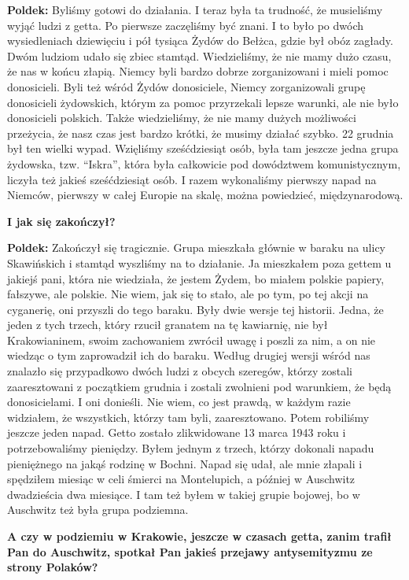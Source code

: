 \begin{otherlanguage}{polish}
\textbf{Poldek:} Byliśmy gotowi do działania. I teraz była ta trudność, że musieliśmy wyjąć ludzi z getta. Po pierwsze zaczęliśmy być znani. I to było po dwóch wysiedleniach dziewięciu i pół tysiąca Żydów do Bełżca, gdzie był obóz zagłady. Dwóm ludziom udało się zbiec stamtąd. Wiedzieliśmy, że nie mamy dużo czasu, że nas w końcu złapią. Niemcy byli bardzo dobrze zorganizowani i mieli pomoc donosicieli. Byli też wśród Żydów donosiciele, Niemcy zorganizowali grupę donosicieli żydowskich, którym za pomoc przyrzekali lepsze warunki, ale nie było donosicieli polskich. Także wiedzieliśmy, że nie mamy dużych możliwości przeżycia, że nasz czas jest bardzo krótki, że musimy działać szybko. 22 grudnia był ten wielki wypad. Wzięliśmy sześćdziesiąt osób, była tam jeszcze jedna grupa żydowska, tzw. "`Iskra"', która była całkowicie pod dowództwem komunistycznym, liczyła też jakieś sześćdziesiąt osób. I razem wykonaliśmy pierwszy napad na Niemców, pierwszy w całej Europie na skalę, można powiedzieć, międzynarodową. 
 
\textbf{I jak się zakończył?}

\textbf{Poldek:} Zakończył się tragicznie. Grupa mieszkała głównie w baraku na ulicy Skawińskich i stamtąd wyszliśmy na to działanie. Ja mieszkałem poza gettem u jakiejś pani, która nie wiedziała, że jestem Żydem, bo miałem polskie papiery, fałszywe, ale polskie. Nie wiem, jak się to stało, ale po tym, po tej akcji na cyganerię, oni przyszli do tego baraku. Były dwie wersje tej historii. Jedna, że jeden z tych trzech, który rzucił granatem na tę kawiarnię, nie był Krakowianinem, swoim zachowaniem zwrócił uwagę i poszli za nim, a on nie wiedząc o tym zaprowadził ich do baraku. Według drugiej wersji wśród nas znalazło się przypadkowo dwóch ludzi z obcych szeregów, którzy zostali zaaresztowani z początkiem grudnia i zostali zwolnieni pod warunkiem, że będą donosicielami. I oni donieśli. Nie wiem, co jest prawdą, w każdym razie widziałem, że wszystkich, którzy tam byli, zaaresztowano. Potem robiliśmy jeszcze jeden napad. Getto zostało zlikwidowane 13 marca 1943 roku i potrzebowaliśmy pieniędzy. Byłem jednym z trzech, którzy dokonali napadu pieniężnego na jakąś rodzinę w Bochni. Napad się udał, ale mnie złapali i spędziłem miesiąc w celi śmierci na Montelupich, a później w Auschwitz dwadzieścia dwa miesiące. I tam też byłem w takiej grupie bojowej, bo w Auschwitz też była grupa podziemna. 
  
\textbf{A czy w podziemiu w Krakowie, jeszcze w czasach getta, zanim trafił Pan do Auschwitz, spotkał Pan jakieś przejawy antysemityzmu ze strony Polaków?}


\end{otherlanguage}
